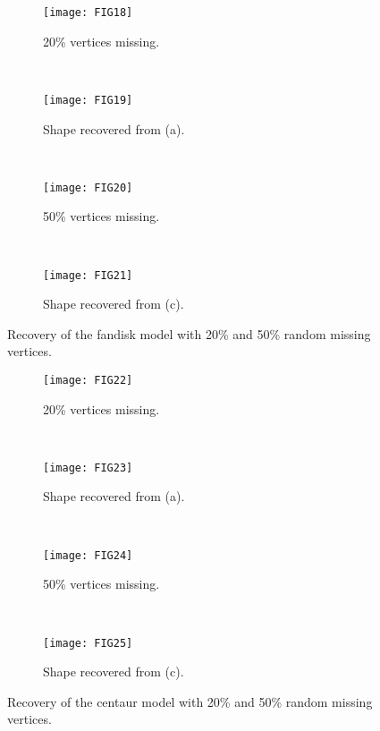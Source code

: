 \begin{figure}
  \centering
    \begin{subfigure}[b]{0.35\linewidth}
        \texttt{[image: FIG18]}
        \caption{20\% vertices missing.}
    \end{subfigure}
    ~
    \begin{subfigure}[b]{0.35\linewidth}
        \texttt{[image: FIG19]}
        \caption{Shape recovered from (a).}
    \end{subfigure}
    \\
    \begin{subfigure}[b]{0.35\linewidth}
        \texttt{[image: FIG20]}
        \caption{50\% vertices missing.}
    \end{subfigure}
    ~
    \begin{subfigure}[b]{0.35\linewidth}
        \texttt{[image: FIG21]}
        \caption{Shape recovered from (c).}
    \end{subfigure}
\caption[Recovery of the fandisk model with random missing vertices.]
{Recovery of the fandisk model with 20\% and 50\% random missing vertices.}
\label{fig:fandisk:recovery}
\end{figure}

\begin{figure}
  \centering
    \begin{subfigure}[b]{0.35\linewidth}
        \texttt{[image: FIG22]}
        \caption{20\% vertices missing.}
    \end{subfigure}
    ~
    \begin{subfigure}[b]{0.35\linewidth}
        \texttt{[image: FIG23]}
        \caption{Shape recovered from (a).}
    \end{subfigure}
    \\
    \begin{subfigure}[b]{0.35\linewidth}
        \texttt{[image: FIG24]}
        \caption{50\% vertices missing.}
    \end{subfigure}
    ~
    \begin{subfigure}[b]{0.35\linewidth}
        \texttt{[image: FIG25]}
        \caption{Shape recovered from (c).}
    \end{subfigure}
\caption[Recovery of the centaur model with random missing vertices.]
{Recovery of the centaur model with 20\% and 50\% random missing vertices.}
\label{fig:centaur:recovery}
\end{figure}

